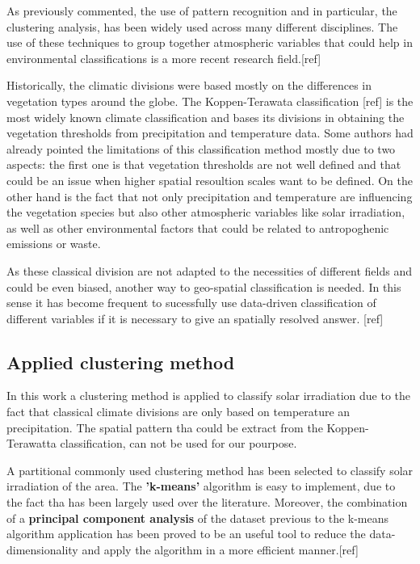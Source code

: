 As previously commented, the use of pattern recognition and in particular, the clustering analysis, has been widely used across many different disciplines. The use of these techniques to group together atmospheric variables that could help in environmental classifications is a more recent research field.[ref]

Historically, the climatic divisions were based mostly on the differences in vegetation types around the globe. The Koppen-Terawata classification [ref] is the most widely known climate classification and bases its divisions in obtaining the vegetation thresholds from precipitation and temperature data. Some authors had already pointed the limitations of this classification method mostly due to two aspects: the first one is that vegetation thresholds are not well defined and that could be an issue when higher spatial resoultion scales want to be defined. On the other hand is the fact that not only precipitation and temperature are influencing the vegetation species but also other atmospheric variables like solar irradiation, as well as other environmental factors that could be related to antropoghenic emissions or waste.


As these classical division are not adapted to the necessities of different fields and could be even biased, another way to geo-spatial classification is needed. In this sense it has become frequent to sucessfully use data-driven classification of different variables if it is necessary to give an spatially resolved answer. [ref]

\subsection{Applied clustering method}

In this work a clustering method is applied to classify solar irradiation due to the fact that classical climate divisions are only based on temperature an precipitation. The spatial pattern tha could be extract from the Koppen-Terawatta classification, can not be used for our pourpose.

A partitional commonly used clustering method has been selected to classify solar irradiation of the area. The \textbf{'k-means'} algorithm is easy to implement, due to the fact tha has been largely used over the literature. Moreover, the combination of a \textbf{principal component analysis} of the dataset previous to the k-means algorithm application has been proved to be an useful tool to reduce the data-dimensionality and apply the algorithm in a more efficient manner.[ref]

